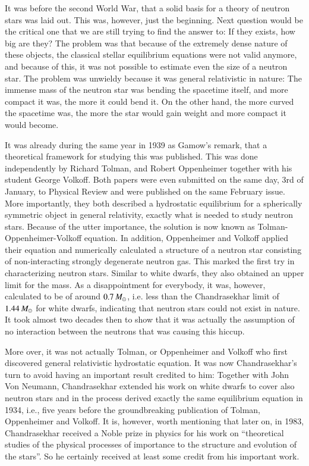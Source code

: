 It was before the second World War, that a solid basis for a theory of neutron stars was laid out.
This was, however, just the beginning. 
Next question would be the critical one that we are still trying to find the answer to:
If they exists, how big are they?
The problem was that because of the extremely dense nature of these objects, the classical stellar equilibrium equations were not valid anymore, and because of this, it was not possible to estimate even the size of a neutron star.
The problem was unwieldy because it was general relativistic in nature:
The immense mass of the neutron star was bending the spacetime itself, and more compact it was, the more it could bend it. 
On the other hand, the more curved the spacetime was, the more the star would gain weight and more compact it would become.

It was already during the same year in 1939 as Gamow's remark, that a theoretical framework for studying this was published.
This was done independently by Richard Tolman\cite{Tolman39}, and Robert Oppenheimer together with his student George Volkoff\cite{OV39}.
Both papers were even submitted on the same day, 3rd of January, to Physical Review and were published on the same February issue.
More importantly, they both described a hydrostatic equilibrium for a spherically symmetric object in general relativity, exactly what is needed to study neutron stars.
Because of the utter importance, the solution is now known as Tolman-Oppenheimer-Volkoff equation.
In addition, Oppenheimer and Volkoff applied their equation and numerically calculated a structure of a neutron star consisting of non-interacting strongly degenerate neutron gas.
This marked the first try in characterizing neutron stars.
Similar to white dwarfs, they also obtained an upper limit for the mass. 
As a disappointment for everybody, it was, however, calculated to be of around $0.7\, M_{\odot}$, i.e. less than the Chandrasekhar limit of $1.44\, M_{\odot}$ for white dwarfs, indicating that neutron stars could not exist in nature.
It took almost two decades then to show that it was actually the assumption of no interaction between the neutrons that was causing this hiccup.

More over, it was not actually Tolman, or Oppenheimer and Volkoff who first discovered general relativistic hydrostatic equation.
It was now Chandrasekhar's turn to avoid having an important result credited to him:
Together with John Von Neumann, Chandrasekhar extended his work on white dwarfs to cover also neutron stars and in the process derived exactly the same equilibrium equation in 1934, i.e., five years before the groundbreaking publication of Tolman, Oppenheimer and Volkoff.\cite{Baym82}
It is, however, worth mentioning that later on, in 1983, Chandrasekhar received a Noble prize in physics for his work on ``theoretical studies of the physical processes of importance to the structure and evolution of the stars''.
So he certainly received at least some credit from his important work.


